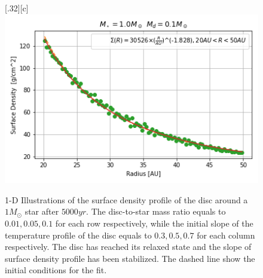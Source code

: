 \documentclass[aps,prb,twocolumn,superscriptaddress,floatfix,longbibliography]{revtex4-2}
\begin{document}
\begin{appendices}
\begin{figure}[!htbp]
  \subcaptionbox*{}[.32\linewidth][c]{%
    \includegraphics[width=\linewidth]{Graphs_1D/r_1s_0.1d_0.7q_1D.png}}\quad
  \caption{1-D Illustrations of the surface density profile of the disc around a $1 M_{\odot}$ star after $5000yr$. The disc-to-star mass ratio equals to $0.01, 0.05, 0.1$ for each row respectively, while the initial slope of the temperature profile of the disc equals to $0.3, 0.5, 0.7$ for each column respectively. The disc has reached its relaxed state and the slope of surface density profile has been stabilized. The dashed line show the initial conditions for the fit.}
\end{figure} 
\clearpage

\end{appendices}
\end{document}
